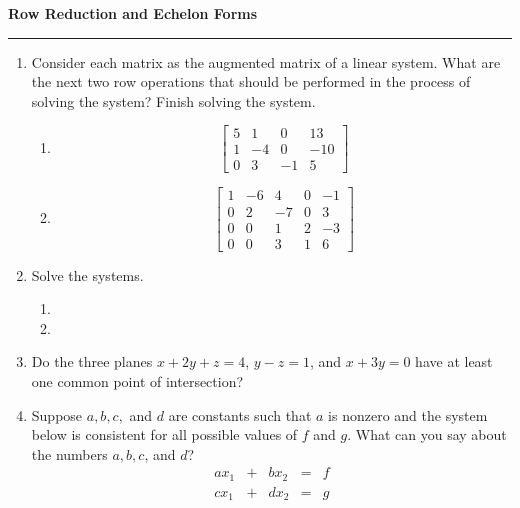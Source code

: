 \documentclass[12pt]{article}
\begin{document}
\begin{center}
{\bf \Large Row Reduction and Echelon Forms}
\vspace{0.2cm}
\hrule
\end{center}

\begin{multicols*}{2}
	\begin{enumerate}
		\item Consider each matrix as the augmented matrix of a linear system. What are the next two row operations that should be performed in the process of solving the system? Finish solving the system.
		\begin{enumerate}
			\item \[
			\begin{bmatrix}
				5 & 1 & 0 & 13\\
				1 & -4 & 0 & -10\\
				0 & 3 & -1 & 5
			\end{bmatrix}
			\]
			\vfill
			\item \[
			\begin{bmatrix}
				1 & -6 & 4 & 0 & -1\\
				0 & 2 & -7 & 0 & 3\\
				0 & 0 & 1 & 2 & -3\\
				0 & 0 & 3 & 1 & 6
			\end{bmatrix}
			\]
			\vfill
		\end{enumerate}

		\item Solve the systems.
		\begin{enumerate}
			\item {}

			\vfill

			\item {}
		\end{enumerate}
		\vfill
		\item Do the three planes $x+2y+z=4$, $y-z=1$, and $x+3y=0$ have at least one common point of intersection?
		\vfill\null\columnbreak

		\item Suppose $a,b,c,$ and $d$ are constants such that $a$ is nonzero and the system below is consistent for all possible values of $f$ and $g$. What can you say about the numbers $a,b,c$, and $d$?
		\[
		\begin{array}{rcrcr}
			ax_1 & + & bx_2 & = & f\\
			cx_1 & + & dx_2 & = & g	
		\end{array}
		\]
		\vfill


\end{enumerate}
\end{multicols*}
\end{document}
